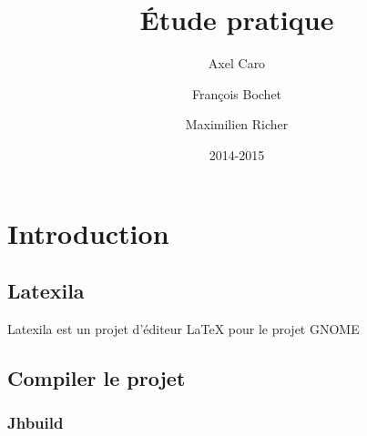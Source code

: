 \documentclass[a4paper,11pt]{report}
\title{Étude pratique}
\author{Axel Caro\and François Bochet\and Maximilien Richer}
\date{2014-2015}
\begin{document}
\maketitle %
\tableofcontents %

\chapter{Introduction}

\section{Latexila}
\label{latexila}
  Latexila est un projet d'éditeur LaTeX pour le projet GNOME
\section{Compiler le projet}
  \subsection{Jhbuild}
  \label{jhbuild}
\end{document}
